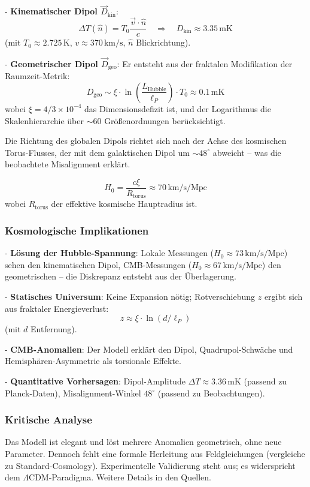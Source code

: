 	- \textbf{Kinematischer Dipol $\vec{D}_{\text{kin}}$}:
	\[
	\Delta T(\hat{n}) = T_0 \frac{\vec{v} \cdot \hat{n}}{c} \quad \Rightarrow \quad D_{\text{kin}} \approx 3.35\,\text{mK}
	\]
	(mit $T_0 \approx 2.725\,\text{K}$, $v \approx 370\,\text{km/s}$, $\hat{n}$ Blickrichtung).
	
	- \textbf{Geometrischer Dipol $\vec{D}_{\text{geo}}$}:
	Er entsteht aus der fraktalen Modifikation der Raumzeit-Metrik:
	\[
	D_{\text{geo}} \sim \xi \cdot \ln\left(\frac{L_{\text{Hubble}}}{\ell_P}\right) \cdot T_0 \approx 0.1\,\text{mK}
	\]
	wobei $\xi = 4/3 \times 10^{-4}$ das Dimensionsdefizit ist, und der Logarithmus die Skalenhierarchie über $\sim 60$ Größenordnungen berücksichtigt.
	
	Die Richtung des globalen Dipols richtet sich nach der Achse des kosmischen Torus-Flusses, der mit dem galaktischen Dipol um $\sim 48^\circ$ abweicht – was die beobachtete Misalignment erklärt.
	
	\[
	H_0 = \frac{c \xi}{R_{\text{torus}}} \approx 70\,\text{km/s/Mpc}
	\]
	wobei $R_{\text{torus}}$ der effektive kosmische Hauptradius ist.
	
	\subsubsection{Kosmologische Implikationen}
	
	- \textbf{Lösung der Hubble-Spannung}: Lokale Messungen ($H_0 \approx 73\,\text{km/s/Mpc}$) sehen den kinematischen Dipol, CMB-Messungen ($H_0 \approx 67\,\text{km/s/Mpc}$) den geometrischen – die Diskrepanz entsteht aus der Überlagerung.
	
	- \textbf{Statisches Universum}: Keine Expansion nötig; Rotverschiebung $z$ ergibt sich aus fraktaler Energieverlust:
	\[
	z \approx \xi \cdot \ln(d / \ell_P)
	\]
	(mit $d$ Entfernung).
	
	- \textbf{CMB-Anomalien}: Der Modell erklärt den Dipol, Quadrupol-Schwäche und Hemisphären-Asymmetrie als torsionale Effekte.
	
	- \textbf{Quantitative Vorhersagen}: Dipol-Amplitude $\Delta T \approx 3.36\,\text{mK}$ (passend zu Planck-Daten), Misalignment-Winkel $48^\circ$ (passend zu Beobachtungen).
	
	\subsubsection{Kritische Analyse}
	
	Das Modell ist elegant und löst mehrere Anomalien geometrisch, ohne neue Parameter. Dennoch fehlt eine formale Herleitung aus Feldgleichungen (vergleiche zu Standard-Cosmology). Experimentelle Validierung steht aus; es widerspricht dem $\Lambda$CDM-Paradigma. Weitere Details in den Quellen.
